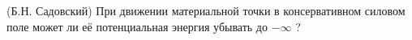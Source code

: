(Б.Н. Садовский)
При движении материальной точки в консервативном силовом поле может ли
её потенциальная энергия убывать до $-\infty$ ?
